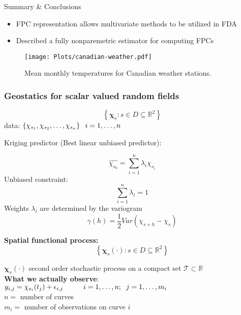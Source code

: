 \documentclass{beamer}
\newcommand{\Real}{\ensuremath{ \mathbb{R} }}
\begin{document}
\begin{frame}[t]{Summary \& Conclusions}
	\begin{itemize}
		\item FPC representation allows multivariate methods to be utilized in FDA
		\item Described a fully nonparemetric estimator for computing FPCs
	\end{itemize}
	
\end{frame}



\frame
{
\begin{figure}
\begin{center}
\texttt{[image: Plots/canadian-weather.pdf]}
\caption{ Mean monthly temperatures for Canadian weather stations.}
\end{center}
\end{figure}
}


\frame
{
\frametitle{Geostatics for scalar valued random fields}
\[
	 \left\{ \boldsymbol\chi_s: s \in D  \subseteq \Real^2\right\} 
\] 
data: $\left\{ \chi_{s_1}, \chi_{s_2}, \dots, \chi_{s_n} \right\} \hspace{0.2cm} i = 1, \dots, n$

Kriging predictor (Best linear unbiased predictor):

\[
\widehat{\chi_{s_0}} = \sum_{i=1}^n \lambda_i \chi_{s_i}
\]
Unbiased constraint: 
\[
\sum_{i=1}^n \lambda_i = 1
\]
Weights $\lambda_i$ are determined by the variogram
\[
\gamma(h) = \frac{1}{2}Var(\chi_{s+h} -\chi_s)
\]
}

\frame
{
  \textbf{Spatial functional process:}\\
	\[
	 \left\{ \boldsymbol\chi_s(\cdot): s \in D  \subseteq \Real^2\right\} 
	 \] 
	 
	$\boldsymbol\chi_s(\cdot)$ second order stochastic process on a compact set $\mathcal{T} \subset \Real$\\[0.2cm]
	
	\textbf{What we actually observe}:\\[0.2cm]
	
	$y_{i,j} = \chi_{s_i}(t_j) + \epsilon_{i,j} \hspace{1cm} i = 1,\dots, n; \hspace{0.2cm} j = 1,\dots, m_i$\\[0.3cm]
	
	$n =$ number of curves\\
	$m_i=$ number of observations on curve $i$
}
\end{document}

